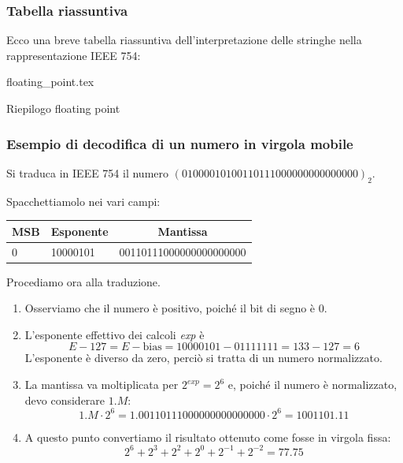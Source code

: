 \documentclass[class=book, crop=false]{standalone}
\begin{document}
\subsubsection{Tabella riassuntiva}
Ecco una breve tabella riassuntiva dell'interpretazione delle stringhe nella rappresentazione IEEE 754:
\begin{table}[h!]
	\centering
	{floating_point.tex}
	\caption{Riepilogo floating point}
\end{table}

\subsubsection{Esempio di decodifica di un numero in virgola mobile}
Si traduca in IEEE 754 il numero \((01000010 10011011 10000000 00000000)_2\).

Spacchettiamolo nei vari campi:
\begin{table}[h!]
	\centering
	\begin{tabular}{|l|l|l|}
		\hline
		\multicolumn{1}{|c|}{MSB} & \multicolumn{1}{c|}{Esponente} & \multicolumn{1}{c|}{Mantissa} \\ \hline
		0 & 10000101 & 00110111000000000000000\\\hline
	\end{tabular}
\end{table}
Procediamo ora alla traduzione.
\begin{enumerate}
	\item Osserviamo che il numero è positivo, poiché il bit di segno è 0.
	\item L'esponente effettivo dei calcoli \emph{exp} è
	\begin{equation*}
		E - 127 = E - \text{bias} = 10000101 - 01111111 = 133 - 127 = 6
	\end{equation*}
	L'esponente è diverso da zero, perciò si tratta di un numero normalizzato.
	\item La mantissa va moltiplicata per \(2^{exp} = 2^{6}\) e, poiché il numero è normalizzato, devo considerare $1.M$:
	\begin{equation*}
		1.M \cdot 2^{6} = 1.00110111000000000000000 \cdot 2^{6} = 1001101.11
	\end{equation*}
	\item A questo punto convertiamo il risultato ottenuto come fosse in virgola fissa:
	\begin{equation*}
		2^{6} + 2^{3} + 2^{2} + 2^{0} + 2^{-1} + 2^{-2} = 77.75
	\end{equation*}
\end{enumerate}
\end{document}
